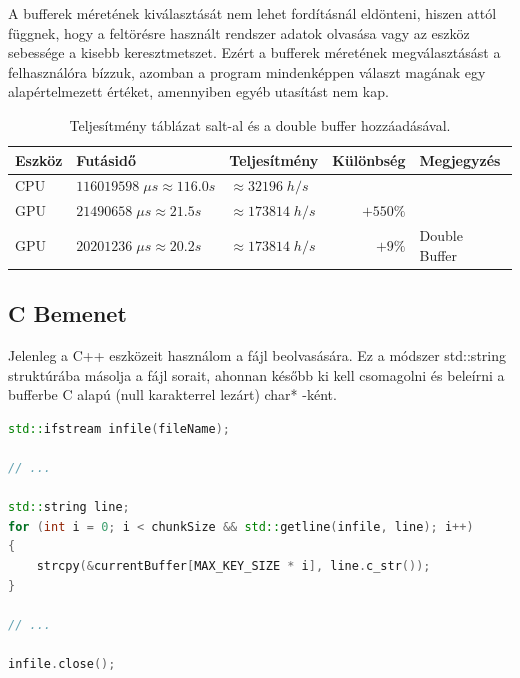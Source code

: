 A bufferek méretének kiválasztását nem lehet fordításnál eldönteni, hiszen attól függnek, hogy a feltörésre használt rendszer adatok olvasása vagy az eszköz sebessége a kisebb keresztmetszet. Ezért a bufferek méretének megválasztásást a felhasználóra bízzuk, azomban a program mindenképpen választ magának egy alapértelmezett értéket, amennyiben egyéb utasítást nem kap. 

\begin{table}[H]
    \centering
    \begin{tabular}{l|l|l|r|l}
        \textbf{Eszköz} & \textbf{Futásidő} & \textbf{Teljesítmény} & \textbf{Különbség} & \textbf{Megjegyzés} \\
        \hline
        \hline
        
        CPU & $\num{116 019 598} \; \mu s \approx \num{116.0}s $ & $\approx \num{32 196} \; h/s$ & & \\
        \hline
                            
        GPU & $\num{21 490 658} \; \mu s \approx \num{21.5}s $ & $\approx \num{173 814} \; h/s$ & $+550\%$ & \\
        \hline
        
        GPU & $\num{20 201 236} \; \mu s \approx \num{20.2}s $ & $\approx \num{173 814} \; h/s$ & $+9\%$ & Double Buffer \\
        \hline
    \end{tabular}
    \caption{Teljesítmény táblázat salt-al és a double buffer hozzáadásával.}
\end{table}



\subsection{C Bemenet}

Jelenleg a C++ eszközeit használom a fájl beolvasására. Ez a módszer std::string struktúrába másolja a fájl sorait, ahonnan később ki kell csomagolni és beleírni a bufferbe C alapú (null karakterrel lezárt) char* -ként.


\begin{lstlisting}[language={C++}]
std::ifstream infile(fileName);

// ...

std::string line;
for (int i = 0; i < chunkSize && std::getline(infile, line); i++)
{
    strcpy(&currentBuffer[MAX_KEY_SIZE * i], line.c_str());
}

// ...

infile.close();
\end{lstlisting}

